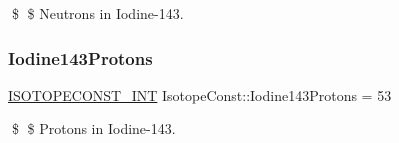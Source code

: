 \$ \$ Neutrons in Iodine-\/143. \mbox{\label{group___isotope_const-_iodine-_i143_ga991c162073a5afad398a3de02689fa04}} 
\subsubsection{\texorpdfstring{Iodine143\+Protons}{Iodine143Protons}}
{\footnotesize\ttfamily \mbox{\hyperlink{group___isotope_const-_macros_ga5f18360b3e99483a35c32d789e62621c}{I\+S\+O\+T\+O\+P\+E\+C\+O\+N\+S\+T\+\_\+\+I\+NT}} Isotope\+Const\+::\+Iodine143\+Protons = 53}

\$ \$ Protons in Iodine-\/143. 